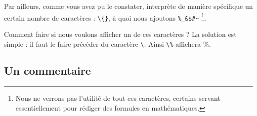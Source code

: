 










Par ailleurs, comme vous avez pu le constater, \logiciel{\LaTex} interprète de manière spécifique un certain nombre de caractères : \verb|\{}|, à quoi nous ajoutons \verb|%_&$#~| \footnote{Nous ne verrons pas l'utilité \LaTex de tout ces caractères, certains servant essentiellement pour rédiger des formules en mathématiques.}.

Comment faire si nous voulons afficher un de ces caractères ? La solution est simple : il faut le faire précéder du caractère \verb|\|. Ainsi \verb|\%| affichera \%.   




\subsection{Un commentaire}

